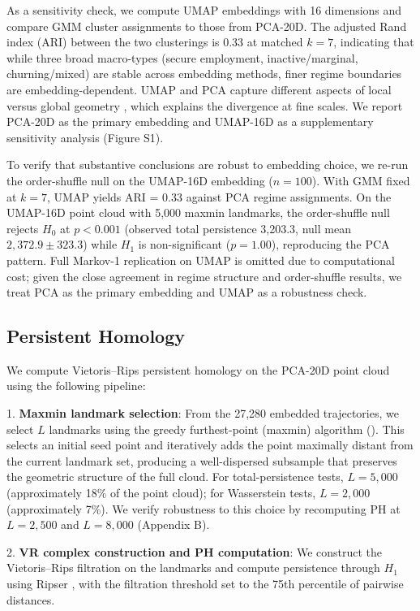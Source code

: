 As a sensitivity check, we compute UMAP embeddings with 16 dimensions and compare GMM cluster assignments to those from PCA-20D. The adjusted Rand index (ARI) between the two clusterings is 0.33 at matched $k = 7$, indicating that while three broad macro-types (secure employment, inactive/marginal, churning/mixed) are stable across embedding methods, finer regime boundaries are embedding-dependent. UMAP and PCA capture different aspects of local versus global geometry \citep{mcinnes2018umap}, which explains the divergence at fine scales. We report PCA-20D as the primary embedding and UMAP-16D as a supplementary sensitivity analysis (Figure S1).

To verify that substantive conclusions are robust to embedding choice, we re-run the order-shuffle null on the UMAP-16D embedding ($n = 100$). With GMM fixed at $k = 7$, UMAP yields ARI = 0.33 against PCA regime assignments. On the UMAP-16D point cloud with 5,000 maxmin landmarks, the order-shuffle null rejects $H_0$ at $p < 0.001$ (observed total persistence 3,203.3, null mean $2{,}372.9 \pm 323.3$) while $H_1$ is non-significant ($p = 1.00$), reproducing the PCA pattern. Full Markov-1 replication on UMAP is omitted due to computational cost; given the close agreement in regime structure and order-shuffle results, we treat PCA as the primary embedding and UMAP as a robustness check.

\subsection{Persistent Homology}

We compute Vietoris--Rips persistent homology on the PCA-20D point cloud using the following pipeline:

1. \textbf{Maxmin landmark selection}: From the 27,280 embedded trajectories, we select $L$ landmarks using the greedy furthest-point (maxmin) algorithm (\citet{desilva2004topological}). This selects an initial seed point and iteratively adds the point maximally distant from the current landmark set, producing a well-dispersed subsample that preserves the geometric structure of the full cloud. For total-persistence tests, $L = 5{,}000$ (approximately 18\% of the point cloud); for Wasserstein tests, $L = 2{,}000$ (approximately 7\%). We verify robustness to this choice by recomputing PH at $L = 2{,}500$ and $L = 8{,}000$ (Appendix B).

2. \textbf{VR complex construction and PH computation}: We construct the Vietoris--Rips filtration on the landmarks and compute persistence through $H_1$ using Ripser \citep{bauer2021ripser}, with the filtration threshold set to the 75th percentile of pairwise distances.

